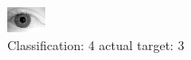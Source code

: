 \begin{figure}[h!]
\begin{center}
\includegraphics[width=0.60\columnwidth]{figures/ID2098_class_4_target_3.png}
\end{center}
\caption{ Classification: 4 actual target: 3}
\label{fig:ID2098_class_4_target_3}
\end{figure}
